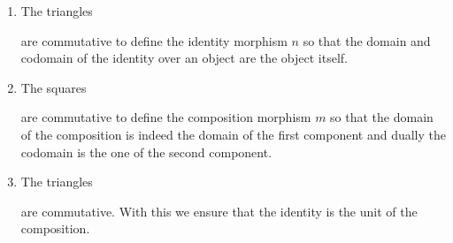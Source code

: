 \begin{definition}
\begin{enumerate}[\bfseries (G1)]
        \item The triangles
        \begin{center}
        \end{center} are commutative to define the identity morphism $n$ so that the domain and codomain of the identity over an object are the object itself.
        
        \item The squares
        \begin{center}
        \end{center} are commutative to define the composition morphism $m$ so that the domain of the composition is indeed the domain of the first component and dually the codomain is the one of the second component.

        \item The triangles
        \begin{center}
        \end{center} are commutative. With this we ensure that the identity is the unit of the composition.


\end{enumerate}
\end{definition}
